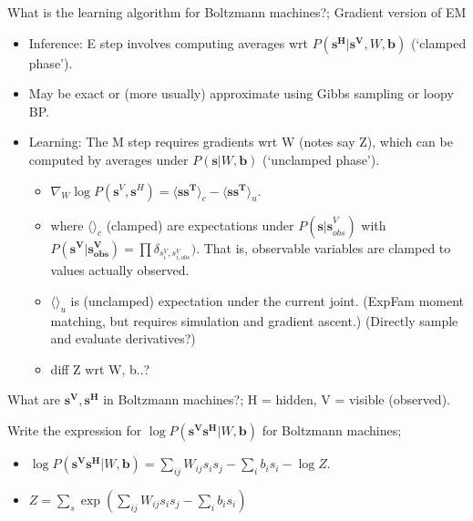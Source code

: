 \documentclass{article}
\begin{document}
What is the learning algorithm for Boltzmann machines?; Gradient version of EM \begin{itemize} \item Inference: E step involves computing averages wrt $P(\mathbf{s^H|s^V}, W, \mathbf{b})$ (`clamped phase'). \item May be exact or (more usually) approximate using Gibbs sampling or loopy BP. \item Learning: The M step requires gradients wrt W (notes say Z), which can be computed by averages under $P(\mathbf{s}|W, \mathbf{b})$ (`unclamped phase'). \begin{itemize} \item $\nabla_W\log P(\mathbf{s}^V, \mathbf{s}^H)=\langle \mathbf{ss^T} \rangle_c - \langle \mathbf{ss^T} \rangle_u$. \item where $\langle \rangle_c$ (clamped) are expectations under $P(\mathbf{s|s}^V_{obs})$ with $P(\mathbf{s^V|s^V_{obs}})=\prod\delta_{s^V_i, s^V_{i, obs}})$. That is, observable variables are clamped to values actually observed. \item $\langle \rangle_u$ is (unclamped) expectation under the current joint. (ExpFam moment matching, but requires simulation and gradient ascent.) (Directly sample and evaluate derivatives?) \item diff Z wrt W, b..? \end{itemize} \end{itemize}

What are $\mathbf{s^V, s^H}$ in Boltzmann machines?; H = hidden, V = visible (observed).

Write the expression for $\log P(\mathbf{s^Vs^H}|W, \mathbf{b})$ for Boltzmann machines;  \begin{itemize} \item $\log P(\mathbf{s^Vs^H}|W, \mathbf{b})=\sum_{ij}W_{ij}s_is_j-\sum_ib_is_i - \log Z$. \item $Z=\sum_s \exp(\sum_{ij}W_{ij}s_is_j - \sum_i b_i s_i)$ \end{itemize}
\end{document}
